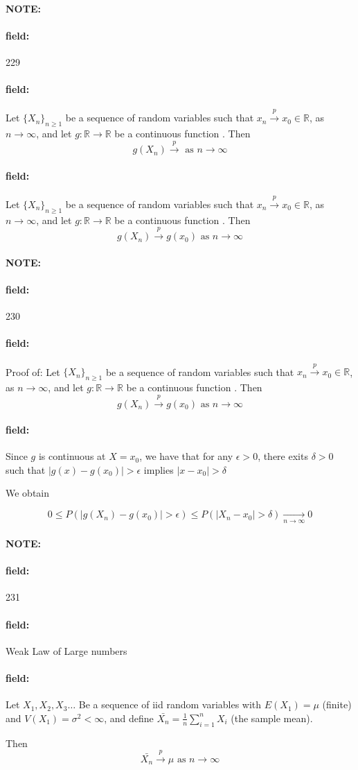 \documentclass[12pt]{article}
\newenvironment{note}{\paragraph{NOTE:}}{}
\newenvironment{field}{\paragraph{field:}}{}
\begin{document}
\begin{note} \begin{field} \tiny 229 \end{field}
  \begin{field}
    Let $\{X_n\}_{n \geq 1}$ be a sequence of random variables such that $x_n \overset{p}{\to} x_0 \in \mathbb{R}$, as $n \to \infty$, and let $g: \mathbb{R} \to \mathbb{R}$ be a continuous function . Then $$g(X_n) \overset{p}{\to}  \text{ as } n \to \infty$$
  \end{field}
  \begin{field}
    Let $\{X_n\}_{n \geq 1}$ be a sequence of random variables such that $x_n \overset{p}{\to} x_0 \in \mathbb{R}$, as $n \to \infty$, and let $g: \mathbb{R} \to \mathbb{R}$ be a continuous function . Then $$g(X_n) \overset{p}{\to} g(x_0) \text{ as } n \to \infty$$
  \end{field}
\end{note}


\begin{note} \begin{field} \tiny 230 \end{field}
  \begin{field}
    Proof of: Let $\{X_n\}_{n \geq 1}$ be a sequence of random variables such that $x_n \overset{p}{\to} x_0 \in \mathbb{R}$, as $n \to \infty$, and let $g: \mathbb{R} \to \mathbb{R}$ be a continuous function . Then $$g(X_n) \overset{p}{\to} g(x_0) \text{ as } n \to \infty$$
  \end{field}
  \begin{field}
    Since $g$ is continuous at $X = x_0$, we have that for any $\epsilon > 0$, there exits $\delta > 0$ such that $|g(x) - g(x_0)| > \epsilon $ implies $|x - x_0| > \delta $

    We obtain

    $$0 \leq P(|g(X_n) - g(x_0)| > \epsilon ) \leq P(|X_n - x_0| > \delta) \underset{n \to \infty}{\to} 0$$
  \end{field}
\end{note}


\begin{note} \begin{field} \tiny 231 \end{field}
  \begin{field}
    Weak Law of Large numbers
  \end{field}
  \begin{field}
    Let $X_1, X_2, X_3 \ldots$ Be a sequence of iid random variables with $E(X_1) = \mu$ (finite) and $V(X_1) = \sigma^2 < \infty$, and define $\bar{X_n} = \frac{1}{n} \sum_{i = 1}^n X_i$ (the sample mean).

    Then $$ \bar{X_n }\overset{p}{\to}\mu \text{ as } n \to \infty$$

  \end{field}
\end{note}
\end{document}
